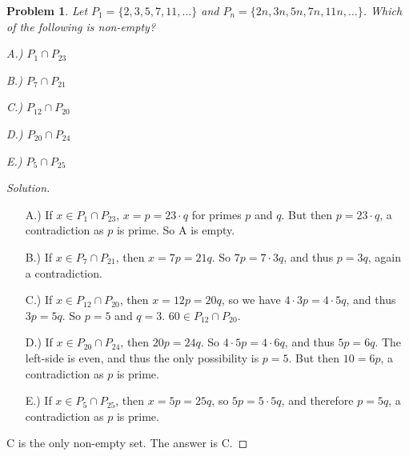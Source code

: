 \documentclass[oneside]{book}
\theoremstyle{mystyle}
\newtheorem{problem}{Problem}[section]
\begin{document}
\begin{problem}
Let $P_1 = \{2,3,5,7,11,\hdots\}$ and $P_n = \{2n,3n,5n,7n,11n,\hdots\}$. Which of the following is non-empty?
\begin{enumerate}
\begin{multicols}{5}
    \item[A.)] $P_1\cap P_{23}$
    \item[B.)] $P_7\cap P_{21}$
    \item[C.)] $P_{12}\cap P_{20}$
    \item[D.)] $P_{20}\cap P_{24}$
    \item[E.)] $P_{5}\cap P_{25}$
\end{multicols}
\end{enumerate}
\end{problem}
\begin{proof}[Solution]
\
\begin{enumerate}
    \item[A.)] If $x\in P_{1}\cap P_{23}$, $x = p = 23\cdot q$ for primes $p$ and $q$. But then $p = 23\cdot q$, a contradiction as $p$ is prime. So A is empty.
    \item[B.)] If $x\in P_{7}\cap P_{21}$, then $x= 7p = 21q$. So $7p = 7\cdot 3q$, and thus $p = 3q$, again a contradiction.
    \item[C.)] If $x\in P_{12}\cap P_{20}$, then $x = 12p = 20q$, so we have $4\cdot 3 p = 4\cdot 5 q$, and thus $3p = 5q$. So $p=5$ and $q = 3$. $60 \in P_{12}\cap P_{20}$.
    \item[D.)] If $x\in P_{20}\cap P_{24}$, then $20p = 24q$. So $4\cdot 5p = 4\cdot 6q$, and thus $5p = 6q$. The left-side is even, and thus the only possibility is $p=5$. But then $10 = 6p$, a contradiction as $p$ is prime.
    \item[E.)] If $x\in P_{5}\cap P_{25}$, then $x = 5p = 25q$, so $5p = 5\cdot 5q$, and therefore $p=5q$, a contradiction as $p$ is prime.
\end{enumerate}
C is the only non-empty set. The answer is C.
\end{proof}
\end{document}
